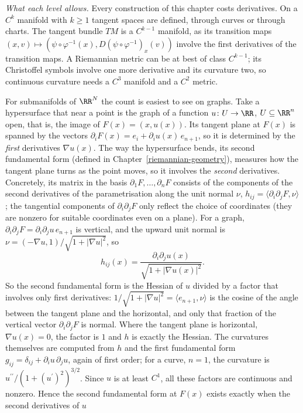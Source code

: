 \begin{remark}\label{smooth-manifolds:remark-regularity-losses}
\emph{What each level allows.} Every construction of this chapter costs derivatives. On a $C^k$ manifold with $k \geq 1$ tangent spaces are defined, through curves or through charts. The tangent bundle $TM$ is a
$C^{k-1}$ manifold, as its transition maps $(x, v) \mapsto (\psi \circ \varphi^{-1}(x), D(\psi \circ \varphi^{-1})_x(v))$ involve the first derivatives of the transition maps. A Riemannian metric can be at best of
class $C^{k-1}$; its Christoffel symbols involve one more derivative and its curvature two, so continuous curvature needs a $C^3$ manifold and a $C^2$ metric.

For submanifolds of $\RR^N$ the count is easiest to see on graphs. Take a hypersurface that near a point is the graph of a function $u \colon U \to \RR$, $U \subseteq \RR^n$ open, that is, the image of
$F(x) = (x, u(x))$. Its tangent plane at $F(x)$ is spanned by the vectors $\partial_iF(x) = e_i + \partial_iu(x)\,e_{n+1}$, so it is determined by the \emph{first} derivatives $\nabla u(x)$. The way the hypersurface
bends, its second fundamental form (defined in Chapter~\ref{riemannian-geometry}), measures how the tangent plane turns as the point moves, so it involves the \emph{second} derivatives. Concretely, its matrix in the
basis $\partial_1F, \ldots, \partial_nF$ consists of the components of the second derivatives of the parametrisation along the unit normal $\nu$, $h_{ij} = \langle\partial_i\partial_jF, \nu\rangle$; the tangential
components of $\partial_i\partial_jF$ only reflect the choice of coordinates (they are nonzero for suitable coordinates even on a plane). For a graph, $\partial_i\partial_jF = \partial_i\partial_ju\,e_{n+1}$ is vertical, and
the upward unit normal is $\nu = (-\nabla u, 1)/\sqrt{1 + |\nabla u|^2}$, so
\[
h_{ij}(x) = \frac{\partial_i\partial_ju(x)}{\sqrt{1 + |\nabla u(x)|^2}} .
\]
So the second fundamental form is the Hessian of $u$ divided by a factor that involves only first derivatives: $1/\sqrt{1 + |\nabla u|^2} = \langle e_{n+1}, \nu\rangle$ is the cosine of the angle between the
tangent plane and the horizontal, and only that fraction of the vertical vector $\partial_i\partial_jF$ is normal. Where the tangent plane is horizontal, $\nabla u(x) = 0$, the factor is $1$ and $h$ is exactly the
Hessian. The curvatures themselves are computed from $h$ and the first fundamental form $g_{ij} = \delta_{ij} + \partial_iu\,\partial_ju$, again of first order; for a curve, $n = 1$, the curvature is
$u^{\prime\prime}/(1 + (u^{\prime})^2)^{3/2}$. Since $u$ is at least $C^1$, all these factors are continuous and nonzero. Hence the second fundamental form at $F(x)$ exists exactly when the second derivatives of $u$

\end{remark}
